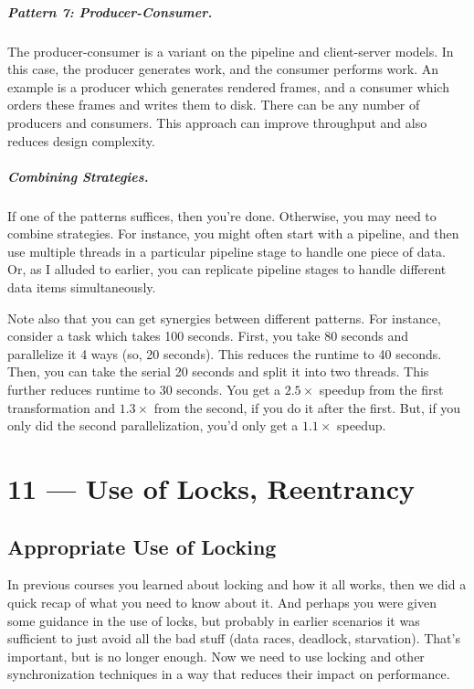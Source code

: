 \documentclass[a4paper]{report}
\begin{document}
\paragraph{Pattern 7: Producer-Consumer.} The producer-consumer is 
a variant on the pipeline and client-server models. In this case, the
producer generates work, and the consumer performs work. An example is
a producer which generates rendered frames, and a consumer which
orders these frames and writes them to disk. There can be any number
of producers and consumers. This approach can improve throughput
and also reduces design complexity.

\paragraph{Combining Strategies.} If one of the patterns suffices,
then you're done. Otherwise, you may need to combine strategies.
For instance, you might often start with a pipeline, and then 
use multiple threads in a particular pipeline stage to handle one
piece of data. Or, as I alluded to earlier, you can replicate
pipeline stages to handle different data items simultaneously.

Note also that you can get synergies between different patterns.
For instance, consider a task which takes 100 seconds. First, you
take 80 seconds and parallelize it 4 ways (so, 20 seconds). This
reduces the runtime to 40 seconds. Then, you can take the serial 
20 seconds and split it into two threads. This further reduces 
runtime to 30 seconds. You get a $2.5\times$ speedup from the
first transformation and $1.3\times$ from the second, if you do it
after the first. But, if you only did the second parallelization,
you'd only get a $1.1\times$ speedup.










\chapter*{11 --- Use of Locks, Reentrancy}


\section*{Appropriate Use of Locking}

In previous courses you learned about locking and how it all works, then we did a quick recap of what you need to know about it. And perhaps you were given some guidance in the use of locks, but probably in earlier scenarios it was sufficient to just avoid all the bad stuff (data races, deadlock, starvation). That's important, but is no longer enough. Now we need to use locking and other synchronization techniques in a way that reduces their impact on performance.
\end{document}
